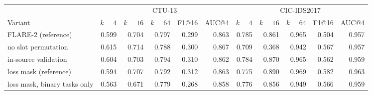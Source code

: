 \begin{tabular}{lrrrrrrrrrr}
\toprule
 & \multicolumn{5}{c}{CTU-13} & \multicolumn{5}{c}{CIC-IDS2017} \\
Variant & $k{=}4$ & $k{=}16$ & $k{=}64$ & F1@16 & AUC@4 & $k{=}4$ & $k{=}16$ & $k{=}64$ & F1@16 & AUC@4 \\
\midrule
FLARE-2 (reference) & 0.599 & 0.704 & 0.797 & 0.299 & 0.863 & 0.785 & 0.861 & 0.965 & 0.504 & 0.957 \\
no slot permutation & 0.615 & 0.714 & 0.788 & 0.300 & 0.867 & 0.709 & 0.368 & 0.942 & 0.567 & 0.957 \\
in-source validation & 0.604 & 0.703 & 0.794 & 0.310 & 0.862 & 0.784 & 0.870 & 0.965 & 0.562 & 0.959 \\
loss mask (reference) & 0.594 & 0.707 & 0.792 & 0.312 & 0.863 & 0.775 & 0.890 & 0.969 & 0.582 & 0.963 \\
loss mask, binary tasks only & 0.563 & 0.671 & 0.779 & 0.268 & 0.858 & 0.776 & 0.856 & 0.949 & 0.566 & 0.959 \\
\bottomrule
\end{tabular}

